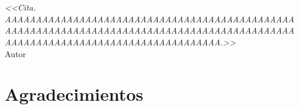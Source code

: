 \documentclass[letterpaper,spanish,12pt,openany]{book}
\begin{document}
\frontmatter
%

\clearpage
\chapter*{}
\begin{flushright}
	{%
	\selectfont\emph{<<Cita. AAAAAAAAAAAAAAAAAAAAAAAAAAAAAAAAAAAAAAAAAAAAAAA AAAAAAAAAAAAAAAAAAAAAAAAAAAAAAAAAAAAAAAAAAAAAAA AAAAAAAAAAAAAAAAAAAAAAAAAAAAAAAAAAA.>>}\\
\vspace{5mm}
	Autor}

\end{flushright}
\vfill
\chapter{Agradecimientos}
\lipsum[6-9]
\tableofcontents %
\mainmatter 






\printbibliography[heading=bibintoc, title={Bibliografía}]

\end{document}
